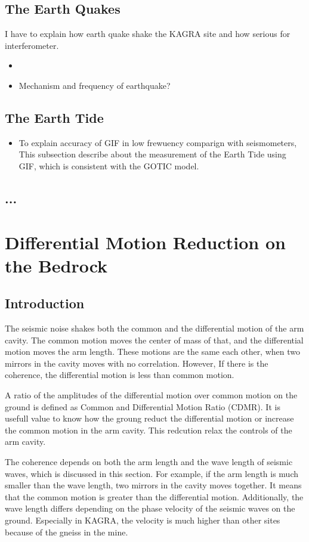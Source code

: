 \documentclass[a4paper,12pt]{book}
\begin{document}
\subsection{The Earth Quakes}
I have to explain how earth quake shake the KAGRA site and how serious for interferometer.
\begin{itemize}
\item 
\item Mechanism and frequency of earthquake?
\end{itemize}

\subsection{The Earth Tide}

\begin{itemize}
  \item To explain accuracy of GIF in low frewuency comparign with seismometers, This subsection describe about the measurement of the Earth Tide using GIF, which is consistent with the GOTIC model.
\end{itemize}

\subsection{...}
\section{Differential Motion Reduction on the Bedrock}
\subsection{Introduction}
The seismic noise shakes both the common and the differential motion of the arm cavity. The common motion moves the center of mass of that, and the differential motion moves the arm length. These motions are the same each other, when two mirrors in the cavity moves with no correlation. However, If there is the coherence, the differential motion is less than common motion.

A ratio of the amplitudes of the differential motion over common motion on the ground is defined as Common and Differential Motion Ratio (CDMR). It is usefull value to know how the groung reduct the differential motion or increase the common motion in the arm cavity. This redcution relax the controls of the arm cavity.

The coherence depends on both the arm length and the wave length of seismic waves, which is discussed in this section. For example, if the arm length is much smaller than the wave length, two mirrors in the cavity moves together. It means that the common motion is greater than the differential motion. Additionally, the wave length differs depending on the phase velocity of the seismic waves on the ground. Especially in KAGRA, the velocity is much higher than other sites because of the gneiss in the mine.
\end{document}
